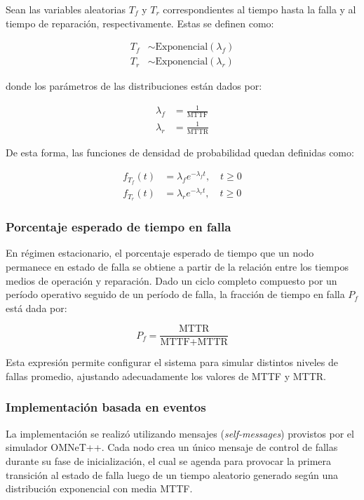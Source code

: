 Sean las variables aleatorias $T_{f}$ y $T_{r}$ correspondientes al tiempo hasta la falla y al tiempo de reparación, respectivamente. Estas se definen como:

\begin{align}
    T_{f} &\sim \text{Exponencial}(\lambda_f) \\
    T_{r} &\sim \text{Exponencial}(\lambda_r)
\end{align}

donde los parámetros de las distribuciones están dados por:

\begin{align}
    \lambda_f &= \frac{1}{\text{MTTF}} \\
    \lambda_r &= \frac{1}{\text{MTTR}}
\end{align}

De esta forma, las funciones de densidad de probabilidad quedan definidas como:

\begin{align}
    f_{T_f}(t) &= \lambda_f e^{-\lambda_f t}, \quad t \geq 0 \\
    f_{T_r}(t) &= \lambda_r e^{-\lambda_r t}, \quad t \geq 0
\end{align}

\subsubsection{Porcentaje esperado de tiempo en falla}

En régimen estacionario, el porcentaje esperado de tiempo que un nodo permanece en estado de falla se obtiene a partir de la relación entre los tiempos medios de operación y reparación. Dado un ciclo completo compuesto por un período operativo seguido de un período de falla, la fracción de tiempo en falla $P_{f}$ está dada por:

\begin{equation}
    P_{f} = \frac{\text{MTTR}}{\text{MTTF} + \text{MTTR}}
\end{equation}

Esta expresión permite configurar el sistema para simular distintos niveles de fallas promedio, ajustando adecuadamente los valores de MTTF y MTTR.


\subsubsection{Implementación basada en eventos}

La implementación se realizó utilizando mensajes (\textit{self-messages}) provistos por el simulador OMNeT++. Cada nodo crea un único mensaje de control de fallas durante su fase de inicialización, el cual se agenda para provocar la primera transición al estado de falla luego de un tiempo aleatorio generado según una distribución exponencial con media MTTF.

